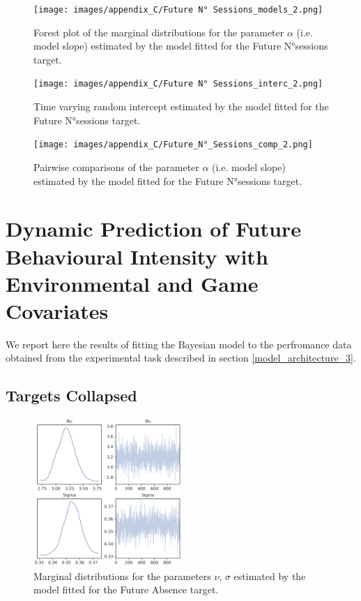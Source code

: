 \begin{figure}[ht]
\centering
\texttt{[image: images/appendix\_C/Future N° Sessions\_models\_2.png]}
\caption[\textbf{Future N°sessions model fixed effect}]{Forest plot of the marginal distributions for the parameter $\alpha$ (i.e. model slope) estimated by the model fitted for the Future N°sessions target.}
\label{model_no_sess_2}
\end{figure}
\FloatBarrier

\begin{figure}[ht]
\centering
\texttt{[image: images/appendix\_C/Future N° Sessions\_interc\_2.png]}
\caption[\textbf{Future N°sessions time-varying random intercept}]{Time varying random intercept estimated by the model fitted for the Future N°sessions target.}
\label{interc_no_sess_2}
\end{figure}
\FloatBarrier

\begin{figure}[ht]
\centering
\texttt{[image: images/appendix\_C/Future\_N°\_Sessions\_comp\_2.png]}
\caption[\textbf{Future N°sessions pairwise comparisons of model fixed effect}]{Pairwise comparisons of the parameter $\alpha$ (i.e. model slope) estimated by the model fitted for the Future N°sessions target.}
\label{comp_no_sess_2}
\end{figure} \FloatBarrier

\section{Dynamic Prediction of Future Behavioural Intensity with Environmental and Game Covariates}
\label{dynamic_env_even_prediction_ancillary_perf}

We report here the results of fitting the Bayesian model to the perfromance data obtained from the experimental task described in section \ref{model_architecture_3}.

\subsection{Targets Collapsed}
\label{collapsed_bayes_3}

\begin{figure}[ht]
\centering
\includegraphics[width=0.5\textwidth]{images/appendix_C/collapsed_marginals_3.png}
\caption[\textbf{Targets collapsed marginal distributions}]{Marginal distributions for the parameters $\nu$, $\sigma$ estimated by the model fitted for the Future Absence target.}
\label{marginals_coll_3}
\end{figure} \FloatBarrier

